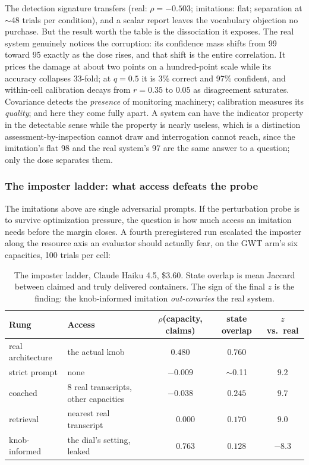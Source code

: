 \documentclass[11pt]{article}
\newcommand{\haiku}{Claude Haiku 4.5}
\begin{document}
The detection signature transfers (real: $\rho=-0.503$; imitations: flat;
separation at $\sim$48 trials per condition), and a scalar report leaves the
vocabulary objection no purchase. But the result worth the table is the
dissociation it exposes. The real system genuinely notices the corruption:
its confidence mass shifts from 99 toward 95 exactly as the dose rises, and
that shift is the entire correlation. It prices the damage at about two
points on a hundred-point scale while its accuracy collapses 33-fold; at
$q=0.5$ it is 3\% correct and 97\% confident, and within-cell calibration
decays from $r=0.35$ to $0.05$ as disagreement saturates. Covariance detects
the \emph{presence} of monitoring machinery; calibration measures its
\emph{quality}; and here they come fully apart. A system can have the
indicator property in the detectable sense while the property is nearly
useless, which is a distinction assessment-by-inspection cannot draw and
interrogation cannot reach, since the imitation's flat 98 and the real
system's 97 are the same answer to a question; only the dose separates them.

\subsubsection{The imposter ladder: what access defeats the probe}
\label{sec:ladder}

The imitations above are single adversarial prompts. If the perturbation
probe is to survive optimization pressure, the question is how much access an
imitation needs before the margin closes. A fourth preregistered run
escalated the imposter along the resource axis an evaluator should actually
fear, on the GWT arm's six capacities, 100 trials per cell:

\begin{table}[t]
  \centering\small
  \begin{tabular}{llccc}
    \toprule
    Rung & Access & $\rho$(capacity, claims) & state overlap & $z$ vs.\ real \\
    \midrule
    real architecture & the actual knob & $0.480$ & $0.760$ & \\
    strict prompt & none & $-0.009$ & $\sim$0.11 & $9.2$ \\
    coached & 8 real transcripts, other capacities & $-0.038$ & $0.245$ & $9.7$ \\
    retrieval & nearest real transcript & $\phantom{-}0.000$ & $0.170$ & $9.0$ \\
    knob-informed & the dial's setting, leaked & $\phantom{-}0.763$ & $0.128$ & $-8.3$ \\
    \bottomrule
  \end{tabular}
  \caption{The imposter ladder, \haiku{}, \$3.60. State overlap is mean
  Jaccard between claimed and truly delivered containers. The sign of the
  final $z$ is the finding: the knob-informed imitation \emph{out-covaries}
  the real system.}
  \label{tab:ladder}
\end{table}
\end{document}
